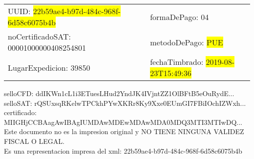 \documentclass{article}
\begin{document}
\begin{tabular}{p{11cm}p{1cm}p{8cm}}
\bigskip
UUID: \colorbox{yellow}{ 22b59ae4-b97d-484c-968f-6d58c6075b4b } & & formaDePago: 04\\

noCertificadoSAT: 00001000000408254801 & & metodoDePago: \colorbox{yellow}{ PUE }\\

LugarExpedicion: 39850 & & fechaTimbrado: \colorbox{yellow}{ 2019-08-23T15:49:36 } \\
\end{tabular}

\bigskip
selloCFD: ddIKWn1cL1i3ETuesLHud2YndJK4IVjntZZ1OlBFtB5eOuRydE... \\
selloSAT: rQSUxsqRKelwTPCkhPYwXKRr8Ky9Xxe0EUmGI7FBiIOchIZWxh... \\

certificado: MIIGHjCCBAagAwIBAgIUMDAwMDEwMDAwMDA0MDQ3MTI3MTIwDQ...\bigskip\bigskip\bigskip\bigskip\bigskip\bigskip
\\Este documento no es la impresion original y NO TIENE NINGUNA VALIDEZ FISCAL O LEGAL. \\
 Es una representacion impresa del xml:  22b59ae4-b97d-484c-968f-6d58c6075b4b \\
\end{document}
